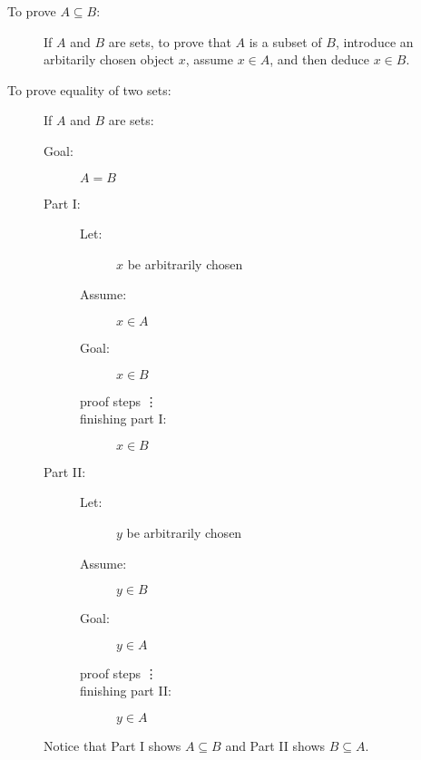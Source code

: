 \documentclass[12pt]{article}
\begin{document}
\begin{description}

\item[To prove $A \subseteq B$:]  If $A$ and $B$ are sets, to prove that $A$ is a subset of $B$, introduce an arbitarily chosen object $x$, assume $x \in A$, and then deduce $x \in B$.

\item[To prove equality of two sets:]  If $A$ and $B$ are sets:

\begin{description}

\item[Goal:]  $A=B$

\item[Part I:]  

\begin{description}
\item[Let:]  $x$ be arbitrarily chosen

\item[Assume:]  $x \in A$

\item[Goal:]  $x \in B$

\item[proof steps \vdots]

\item[finishing part I:]  $x \in B$

\end{description}

\item[Part II:]  

\begin{description}
\item[Let:]  $y$ be arbitrarily chosen

\item[Assume:]  $y \in B$

\item[Goal:]  $y \in A$

\item[proof steps \vdots]

\item[finishing part II:]  $y \in A$

\end{description}

\end{description}

Notice that Part I shows $A \subseteq B$ and Part II shows $B \subseteq A$.

\end{description}
\end{document}
